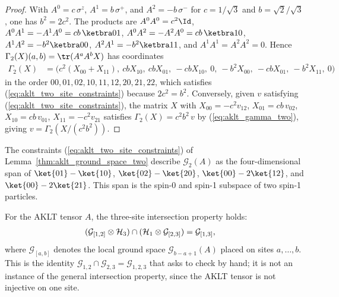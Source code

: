 \begin{proof}
    \leanok
    With $A^0 = c\,\sigma^z$, $A^1 = b\,\sigma^+$, and $A^2 = -b\,\sigma^-$ for
    $c = 1/\sqrt3$ and $b = \sqrt2/\sqrt3$, one has $b^2 = 2c^2$. The products are
    $A^0A^0 = c^2\Id$, $A^0A^1 = -A^1A^0 = cb\,\ketbra01$,
    $A^0A^2 = -A^2A^0 = cb\,\ketbra10$, $A^1A^2 = -b^2\ketbra00$,
    $A^2A^1 = -b^2\ketbra11$, and $A^1A^1 = A^2A^2 = 0$. Hence
    $\Gamma_2(X)(a,b) = \tr(A^aA^bX)$ has coordinates
    \begin{align}
        \Gamma_2(X)
         & = \bigl(c^2(X_{00}+X_{11}),\ cbX_{10},\ cbX_{01},\ -cbX_{10},\ 0,\
        -b^2X_{00},\ -cbX_{01},\ -b^2X_{11},\ 0\bigr)
        \label{eq:aklt_gamma_two}
    \end{align}
    in the order $00,01,02,10,11,12,20,21,22$, which satisfies
    (\ref{eq:aklt_two_site_constraints}) because $2c^2 = b^2$. Conversely,
    given $v$ satisfying (\ref{eq:aklt_two_site_constraints}), the matrix
    $X$ with $X_{00} = -c^2v_{12}$, $X_{01} = cb\,v_{02}$, $X_{10} = cb\,v_{01}$,
    $X_{11} = -c^2v_{21}$ satisfies $\Gamma_2(X) = c^2b^2\,v$ by
    (\ref{eq:aklt_gamma_two}), giving $v = \Gamma_2(X/(c^2b^2))$.
\end{proof}

\begin{remark}\label{rem:aklt_ground_space_two_span}
    The constraints (\ref{eq:aklt_two_site_constraints}) of
    Lemma~\ref{thm:aklt_ground_space_two} describe $\mathcal G_2(A)$ as the
    four-dimensional span of $\ket{01}-\ket{10}$, $\ket{02}-\ket{20}$,
    $\ket{00}-2\ket{12}$, and $\ket{00}-2\ket{21}$. This span is the spin-0
    and spin-1 subspace of two spin-1 particles.
\end{remark}

\begin{lemma}
    \label{thm:aklt_ground_space_intersection_two}
    \leanok
    For the AKLT tensor $A$, the three-site intersection property holds:
    \begin{align}
        (\mathcal G_{[1,2]}\otimes\mathcal H_3)
        \cap(\mathcal H_1\otimes\mathcal G_{[2,3]})
         & = \mathcal G_{[1,3]},
        \notag
    \end{align}
    where $\mathcal G_{[a,b]}$ denotes the local ground space
    $\mathcal G_{b-a+1}(A)$ placed on sites $a,\ldots,b$. This is the identity
    $\mathcal G_{1,2}\cap\mathcal G_{2,3} = \mathcal G_{1,2,3}$ that
    \cite[line~2095]{Cirac2021Matrix} asks to check by hand; it is not an
    instance of the general intersection property, since the AKLT tensor is
    not injective on one site.
\end{lemma}

